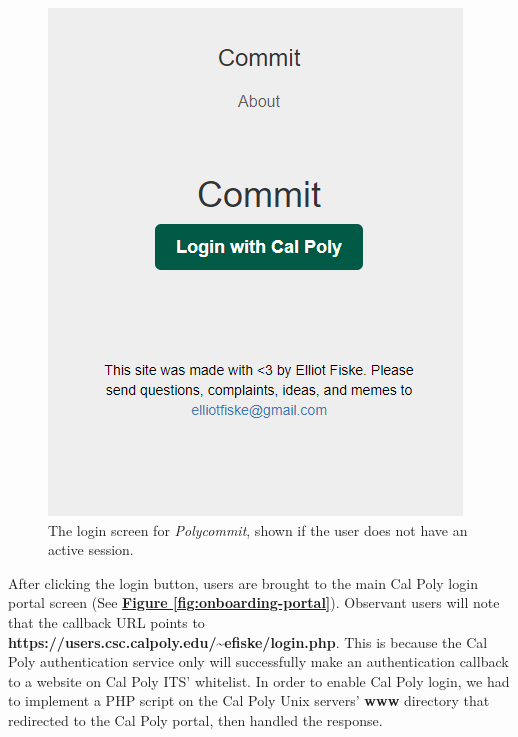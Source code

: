 \begin{figure}[h]
	\includegraphics{figures/onboarding1}
	\caption{The login screen for \textit{Polycommit}, shown if the user does not have an active session.}
	\label{fig:onboarding1}
\end{figure}

\par After clicking the login button, users are brought to the main Cal Poly login portal screen (See \textbf{\hyperref[fig:onboarding-portal]{Figure \ref*{fig:onboarding-portal}}}). Observant users will note that the callback URL points to \textbf{https://users.csc.calpoly.edu/\textasciitilde{}efiske/login.php}. This is because the Cal Poly authentication service only will successfully make an authentication callback to a website on Cal Poly ITS' whitelist. In order to enable Cal Poly login, we had to implement a PHP script on the Cal Poly Unix servers' \textbf{www} directory that redirected to the Cal Poly portal, then handled the response.

